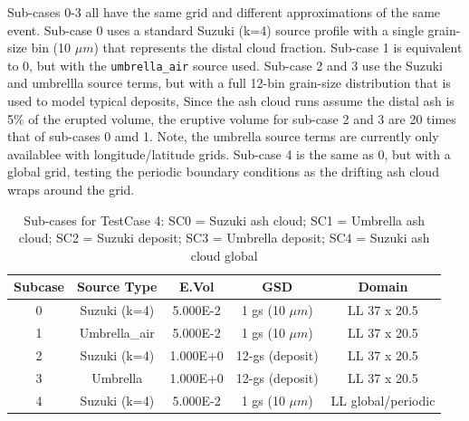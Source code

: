 Sub-cases 0-3 all have the same grid and different approximations of the
same event. Sub-case 0 uses a standard Suzuki (k=4) source profile with a
single grain-size bin (10 $\mu m$) that represents the distal cloud fraction.
Sub-case 1 is equivalent to 0, but with the \texttt{umbrella\_air} source used.
Sub-case 2 and 3 use the Suzuki and umbrellla source terms, but with a
full 12-bin grain-size distribution that is used to model typical
deposits, Since the ash cloud runs assume the distal ash is 5\% of the
erupted volume, the eruptive volume for sub-case 2 and 3 are 20 times that
of sub-cases 0 amd 1. Note, 
the umbrella source terms are currently only availablee with longitude/latitude
grids.
Sub-case 4 is the same as 0, but with a global grid, testing the periodic
boundary conditions as the drifting
ash cloud wraps around the grid.

\small
\begin{table}[htbp]
\begin{center}
\begin{tabular}{| c | c | c | c | c|}
\hline
Subcase & Source Type & E.Vol & GSD & Domain \\
\hline
0  & Suzuki (k=4)   & 5.000E-2 & 1 gs (10 $\mu m$) & LL 37 x 20.5 \\
1  & Umbrella\_air  & 5.000E-2 & 1 gs (10 $\mu m$) & LL 37 x 20.5 \\
2  & Suzuki (k=4)   & 1.000E+0 & 12-gs (deposit)   & LL 37 x 20.5 \\
3  & Umbrella       & 1.000E+0 & 12-gs (deposit)   & LL 37 x 20.5 \\
4  & Suzuki (k=4)   & 5.000E-2 & 1 gs (10 $\mu m$) & LL global/periodic \\
\hline
\end{tabular}
\caption{\label{tab:TC3Subcases}Sub-cases for TestCase 4:
SC0 = Suzuki ash cloud;
SC1 = Umbrella ash cloud;
SC2 = Suzuki deposit;
SC3 = Umbrella deposit;
SC4 = Suzuki ash cloud global}
\end{center}
\end{table}
\normalsize

